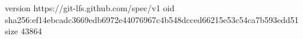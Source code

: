 version https://git-lfs.github.com/spec/v1
oid sha256:ef14ebcadc3669edb6972e44076967c4b548dcced66215e53c54ca7b593edd51
size 43864
